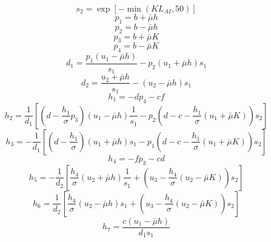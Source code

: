 \begin{equation}
s_{2}=\exp \left[-\min \left(K L_{AI}, 50\right)\right]
\end{equation}
\begin{equation}
p_{1}=b+\bar{\mu} h
\end{equation}
\begin{equation}
p_{2}=b-\bar{\mu} h
\end{equation}
\begin{equation}
p_{3}=b+\bar{\mu} K
\end{equation}
\begin{equation}
p_{4}=b-\bar{\mu} K
\end{equation}
\begin{equation}
d_{1}=\frac{p_{1}\left(u_{1}-\bar{\mu} h\right)}{s_{1}}-p_{2}\left(u_{1}+\bar{\mu} h\right) s_{1}
\end{equation}
\begin{equation}
d_{2}=\frac{u_{2}+\bar{\mu} h}{s_{1}}-\left(u_{2}-\bar{\mu} h\right) s_{1}
\end{equation}
\begin{equation}
h_{1}=-d p_{4}-c f
\end{equation}
\begin{equation}
h_{2}=\frac{1}{d_{1}}\left[\left(d-\frac{h_{1}}{\sigma} p_{3}\right)\left(u_{1}-\bar{\mu} h\right) 
\frac{1}{s_{1}}-p_{2}\left(d-c-\frac{h_{1}}{\sigma}\left(u_{1}+\bar{\mu} K\right)\right) s_{2}\right]
\end{equation}
\begin{equation}
h_{3}=-\frac{1}{d_{1}}\left[\left(d-\frac{h_{1}}{\sigma}\right)\left(u_{1}+\bar{\mu} h\right) 
s_{1}-p_{1}\left(d-c-\frac{h_{1}}{\sigma}\left(u_{1}+\bar{\mu} K\right)\right) s_{2}\right]
\end{equation}
\begin{equation}
h_{4}=-f p_{3}-c d
\end{equation}
\begin{equation}
h_{5}=-\frac{1}{d_{2}}\left[\frac{h_{4}}{\sigma}\left(u_{2}+\bar{\mu} h\right) 
\frac{1}{s_{1}}+\left(u_{3}-\frac{h_{4}}{\sigma}\left(u_{2}-\bar{\mu} K\right)\right) s_{2}\right]
\end{equation}
\begin{equation}
h_{6}=\frac{1}{d_{2}}\left[\frac{h_{4}}{\sigma}\left(u_{2}-\bar{\mu} h\right) 
s_{1}+\left(u_{3}-\frac{h_{4}}{\sigma}\left(u_{2}-\bar{\mu} K\right)\right) s_{2}\right]
\end{equation}
\begin{equation}
h_{7}=\frac{c\left(u_{1}-\bar{\mu} h\right)}{d_{1} s_{1}}
\end{equation}
